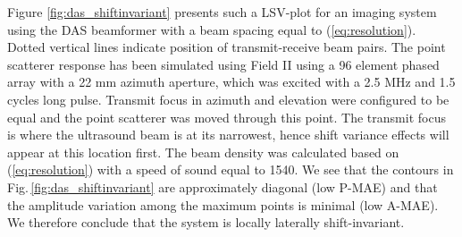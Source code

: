 \documentclass[draftcls]{IEEEtran}
\begin{document}
Figure \ref{fig:das_shiftinvariant} presents such a LSV-plot for an imaging system using the DAS beamformer with a beam spacing equal to (\ref{eq:resolution}). Dotted vertical lines indicate position of transmit-receive beam pairs. The point scatterer response has been simulated using Field II \cite{Jensen1992, Jensen1996a} using a 96 element phased array with a 22 mm azimuth aperture, which was excited with a 2.5 MHz and 1.5 cycles long pulse. Transmit focus in azimuth and elevation were configured to be equal and the point scatterer was moved through this point. The transmit focus is where the ultrasound beam is at its narrowest, hence shift variance effects will appear at this location first. The beam density was calculated  based on (\ref{eq:resolution}) with a speed of sound equal to 1540. We see that the contours in Fig.\,\ref{fig:das_shiftinvariant} are approximately diagonal (low P-MAE) and that the amplitude variation among the maximum points is minimal (low A-MAE). We therefore conclude that the system is locally laterally shift-invariant. %


\end{document}

